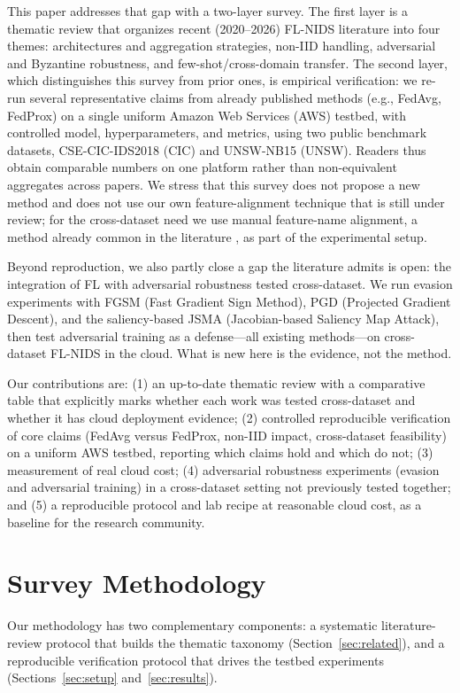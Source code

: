 \documentclass[conference]{IEEEtran}
\begin{document}
This paper addresses that gap with a two-layer survey. The first layer is a thematic
review that organizes recent (2020--2026) FL-NIDS literature into four themes:
architectures and aggregation strategies, non-IID handling, adversarial and Byzantine
robustness, and few-shot/cross-domain transfer. The second layer, which distinguishes
this survey from prior ones, is empirical verification: we re-run several
representative claims from already published methods (e.g., FedAvg, FedProx) on a
single uniform Amazon Web Services (AWS) testbed, with controlled model,
hyperparameters, and metrics, using two public benchmark datasets, CSE-CIC-IDS2018 (CIC) and
UNSW-NB15 (UNSW). Readers thus obtain comparable numbers on one platform rather than
non-equivalent aggregates across papers. We stress that this survey does not propose a
new method and does not use our own feature-alignment technique that is still under
review; for the cross-dataset need we use manual feature-name alignment, a method
already common in the literature \cite{b5}, as part of the experimental setup.

Beyond reproduction, we also partly close a gap the literature admits is open: the
integration of FL with adversarial robustness tested cross-dataset. We run evasion
experiments with FGSM (Fast Gradient Sign Method), PGD (Projected Gradient Descent),
and the saliency-based JSMA (Jacobian-based Saliency Map Attack), then test
adversarial training as a defense---all existing methods---on cross-dataset FL-NIDS in
the cloud. What is new here is the evidence, not the method.

Our contributions are: (1) an up-to-date thematic review with a comparative table that
explicitly marks whether each work was tested cross-dataset and whether it has cloud
deployment evidence; (2) controlled reproducible verification of core claims (FedAvg
versus FedProx, non-IID impact, cross-dataset feasibility) on a uniform AWS testbed,
reporting which claims hold and which do not; (3) measurement of real cloud cost; (4)
adversarial robustness experiments (evasion and adversarial training) in a
cross-dataset setting not previously tested together; and (5) a reproducible protocol
and lab recipe at reasonable cloud cost, as a baseline for the research community.

\section{Survey Methodology}
Our methodology has two complementary components: a systematic literature-review
protocol that builds the thematic taxonomy (Section~\ref{sec:related}), and a reproducible
verification protocol that drives the testbed experiments (Sections~\ref{sec:setup}
and~\ref{sec:results}).
\end{document}

